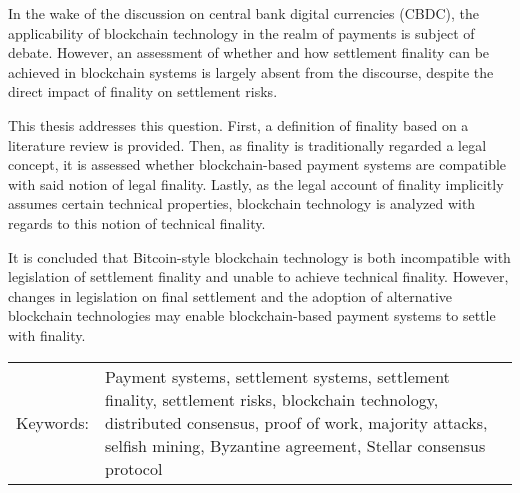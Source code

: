 In the wake of the discussion on central bank digital currencies (CBDC), the applicability of blockchain technology in the realm of payments is subject of debate.
However, an assessment of whether and how settlement finality can be achieved in blockchain systems is largely absent from the discourse, despite the direct impact of finality on settlement risks.

This thesis addresses this question.
First, a definition of finality based on a literature review is provided.
Then, as finality is traditionally regarded a legal concept, it is assessed whether blockchain-based payment systems are compatible with said notion of legal finality.
Lastly, as the legal account of finality implicitly assumes certain technical properties, blockchain technology is analyzed with regards to this notion of technical finality.

It is concluded that Bitcoin-style blockchain technology is both incompatible with legislation of settlement finality and unable to achieve technical finality.
However, changes in legislation on final settlement and the adoption of alternative blockchain technologies may enable blockchain-based payment systems to settle with finality.




\begin{tabularx}{\textwidth}{@{}l X}
  Keywords: & Payment systems, settlement systems, settlement finality, settlement risks, blockchain technology, distributed consensus, proof of work, majority attacks, selfish mining, Byzantine agreement, Stellar consensus protocol
\end{tabularx}
